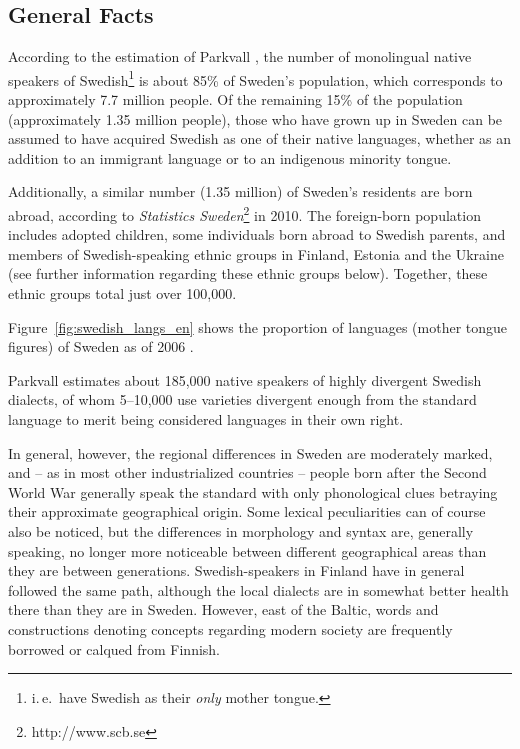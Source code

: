 \begin{multicols}{2}

\subsection{General Facts}

According to the estimation of Parkvall \cite{parkvall2009}, the
number of monolingual native speakers of Swedish\footnote{i.\,e.~have
  Swedish as their \emph{only} mother tongue.} is about 85\% of Sweden’s
population, which corresponds to approximately 7.7 million people. Of
the remaining 15\% of the population (approximately 1.35 million
people), those who have grown up in Sweden can be assumed to have
acquired Swedish as one of their native languages, whether as an
addition to an immigrant language or to an indigenous minority tongue.


Additionally, a similar number (1.35 million) of Sweden's residents
are born abroad, according to \textit{Statistics
  Sweden}\footnote{http://www.scb.se} in 2010. The foreign-born
population includes adopted children, some individuals born abroad to
Swedish parents, and members of Swedish-speaking ethnic groups in
Finland, Estonia and the Ukraine (see further information regarding
these ethnic groups below). Together, these ethnic groups total just
over 100,000.

Figure~\ref{fig:swedish_langs_en} shows the proportion of languages (mother tongue figures) of Sweden as of 2006 \cite{parkvall2009}.

Parkvall \cite{parkvall2009} estimates about 185,000 native speakers
of highly divergent Swedish dialects, of whom 5--10,000 use varieties
divergent enough from the standard language to merit being considered
languages in their own right.

In general, however, the regional differences in Sweden are moderately
marked, and -- as in most other industrialized countries -- people born
after the Second World War generally speak the standard with only
phonological clues betraying their approximate geographical
origin. Some lexical peculiarities can of course also be noticed, but
the differences in morphology and syntax are, generally speaking, no
longer more noticeable between different geographical areas than they
are between generations. Swedish-speakers in Finland have in general
followed the same path, although the local dialects are in somewhat
better health there than they are in Sweden. However, east of the
Baltic, words and constructions denoting concepts regarding modern
society are frequently borrowed or calqued from Finnish.


\end{multicols}
